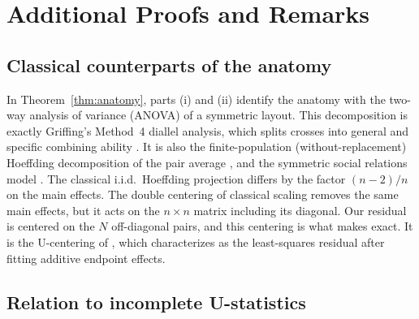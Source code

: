 \section{Additional Proofs and Remarks}
\label{app:supp-proofs}

\subsection{Classical counterparts of the anatomy}

\begin{remark}
In Theorem~\ref{thm:anatomy}, parts (i) and (ii) identify the anatomy with the
two-way analysis of variance (ANOVA) of a symmetric layout.
This decomposition is exactly Griffing's Method~4 diallel analysis, which splits crosses into
general and specific combining ability \citep{griffing1956concept}. It is also
the finite-population (without-replacement) Hoeffding decomposition of the pair
average \citep{nandi1963properties,bloznelis2001orthogonal}, and the symmetric social relations model \citep{kenny1984social}. The
classical i.i.d.\ Hoeffding projection \citep{hoeffding1948class} differs by the
factor $(n-2)/n$ on the main effects. The double centering of classical scaling
\citep{torgerson1952multidimensional,gower1966some} removes the same main effects,
but it acts on the $n\times n$ matrix including its diagonal. Our residual is
centered on the $N$ off-diagonal pairs, and this centering is what makes
 exact. It is the U-centering of
\citet{szekely2014partial}, which \citet{zhang2026ucentering} characterizes as
the least-squares residual after fitting additive endpoint effects.
\end{remark}

\subsection{Relation to incomplete U-statistics}

